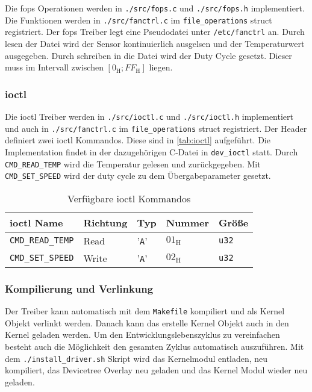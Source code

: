Die \gls{fops} Operationen werden in \texttt{./src/fops.c} und \texttt{./src/fops.h} implementiert.
Die Funktionen werden in \texttt{./src/fanctrl.c} im \texttt{file\_operations} struct registriert.
Der \gls{fops} Treiber legt eine Pseudodatei unter \texttt{/etc/fanctrl} an.
Durch lesen der Datei wird der Sensor kontinuierlich ausgelsen und der Temperaturwert ausgegeben.
Durch schreiben in die Datei wird der Duty Cycle gesetzt.
Dieser muss im Intervall zwischen $\left[0_{\text{H}}; FF_{\text{H}}\right]$ liegen.

\subsubsection{\Acrshort{ioctl}}

Die \gls{ioctl} Treiber werden in \texttt{./src/ioctl.c} und \texttt{./src/ioctl.h} implementiert und auch in \texttt{./src/fanctrl.c} im \texttt{file\_operations} struct registriert.
Der Header definiert zwei \gls{ioctl} Kommandos.
Diese sind in \autoref{tab:ioctl} aufgeführt.
Die Implementation findet in der dazugehörigen C-Datei in \texttt{dev\_ioctl} statt.
Durch \texttt{CMD\_READ\_TEMP} wird die Temperatur gelesen und zurückgegeben.
Mit \texttt{CMD\_SET\_SPEED} wird der duty cycle zu dem Übergabeparameter gesetzt.

\begin{table}[h]
    \centering
    \begin{tabular}{|l|l|l|l|l|}
        \hline
        \textbf{\gls{ioctl} Name} & \textbf{Richtung} & \textbf{Typ} & \textbf{Nummer} & \textbf{Größe} \\
        \hline
        \hline
        \texttt{CMD\_READ\_TEMP} & Read & '\texttt{A}' & $01_{\text{H}}$ & \texttt{u32} \\
        \hline
        \texttt{CMD\_SET\_SPEED} & Write & '\texttt{A}' & $02_{\text{H}}$ & \texttt{u32} \\
        \hline
    \end{tabular}
    \caption{Verfügbare \acrshort{ioctl} Kommandos}
    \label{tab:ioctl}
\end{table}

\subsubsection{Kompilierung und Verlinkung}

Der Treiber kann automatisch mit dem \texttt{Makefile} kompiliert und als Kernel Objekt verlinkt werden.
Danach kann das erstelle Kernel Objekt auch in den Kernel geladen werden.
Um den Entwicklungslebenszyklus zu vereinfachen besteht auch die Möglichkeit den gesamten Zyklus automatisch auszuführen.
Mit dem \texttt{./install\_driver.sh} Skript wird das Kernelmodul entladen, neu kompiliert, das Devicetree Overlay neu geladen und das Kernel Modul wieder neu geladen.
